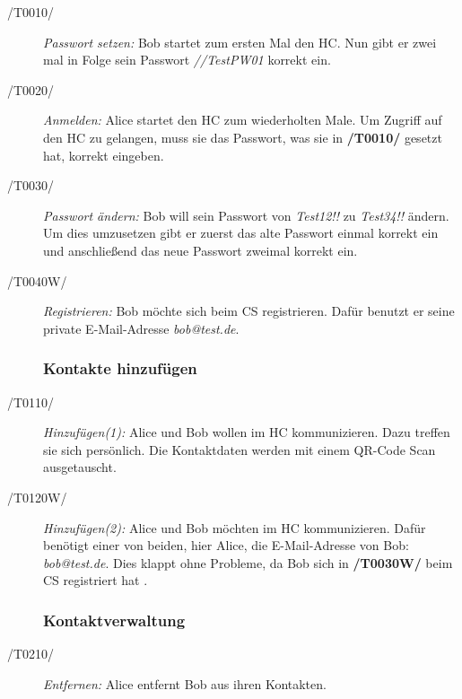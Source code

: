 			\begin{description}
		\item[/T0010/]
			\textit{Passwort setzen:} 
			\textnormal{Bob startet zum ersten Mal den \ac{HC}. 
			Nun gibt er zwei mal in Folge sein Passwort \textit{//TestPW01} korrekt ein. }

		\item[/T0020/] 
			\textit{Anmelden:} 
			\textnormal{Alice startet den \ac{HC} zum wiederholten Male. 
			Um Zugriff auf den \ac{HC} zu gelangen, muss sie das Passwort, was sie in \textbf{/T0010/} gesetzt hat, korrekt eingeben.}
			
			
		\item[/T0030/]
			\textit{Passwort ändern:}
			\textnormal{Bob will sein Passwort von \textit{Test12!!} zu \textit{Test34!!} ändern. 
			Um dies umzusetzen gibt er zuerst das alte Passwort einmal korrekt ein und anschließend das neue Passwort zweimal korrekt ein.}
			
		\item[/T0040W/]
			\textit{Registrieren:}
			\textnormal{Bob möchte sich beim \ac{CS} registrieren. 
			Dafür benutzt er seine private E-Mail-Adresse \textit{
			bob@test.de}. }
			
			
\subsubsection{Kontakte hinzufügen}

			
		\item[/T0110/]
			\textit{Hinzufügen(1):} 
			\textnormal{Alice und Bob wollen im \ac{HC} kommunizieren. 
			Dazu treffen sie sich persönlich. Die Kontaktdaten werden mit einem QR-Code Scan ausgetauscht. 
			  }			
			
		\item[/T0120W/]
			\textit{Hinzufügen(2):} 
			\textnormal{Alice und Bob möchten im \ac{HC} kommunizieren. 
			Dafür benötigt einer von beiden, hier Alice, die E-Mail-Adresse von Bob: \textit{bob@test.de}. 
			Dies klappt ohne Probleme, da Bob sich in \textbf{/T0030W/} beim \ac{CS} registriert hat .}
			
\subsubsection{Kontaktverwaltung}
			
		\item[/T0210/]
			\textit{Entfernen:}
			\textnormal{Alice entfernt Bob aus ihren Kontakten.}
			

\end{description}
